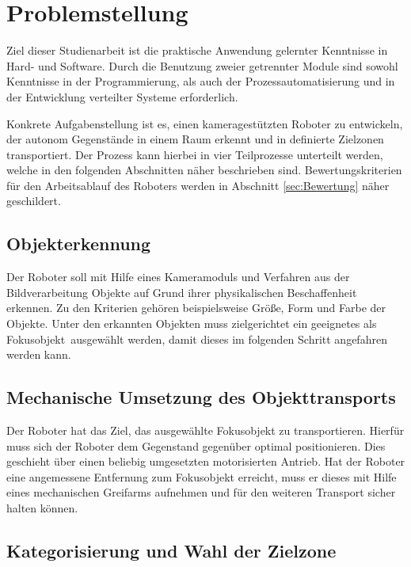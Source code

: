 \chapter{Problemstellung}
\label{cha:Problemstellung}

Ziel dieser Studienarbeit ist die praktische Anwendung gelernter Kenntnisse in Hard- und Software. Durch die Benutzung zweier getrennter Module sind sowohl Kenntnisse in der Programmierung, als auch der Prozessautomatisierung und in der Entwicklung verteilter Systeme erforderlich.

Konkrete Aufgabenstellung ist es, einen kameragestützten Roboter zu entwickeln, der autonom Gegenstände in einem Raum erkennt und in definierte Zielzonen transportiert. Der Prozess kann hierbei in vier Teilprozesse unterteilt werden, welche in den folgenden Abschnitten näher beschrieben sind. Bewertungskriterien für den Arbeitsablauf des Roboters werden in Abschnitt \ref{sec:Bewertung} näher geschildert.

\section{Objekterkennung} 
\label{sec:Erkennung}
Der Roboter soll mit Hilfe eines Kameramoduls und Verfahren aus der Bildverarbeitung Objekte auf Grund ihrer physikalischen Beschaffenheit erkennen. Zu den Kriterien gehören beispielsweise Größe, Form und Farbe der Objekte. Unter den erkannten Objekten muss zielgerichtet ein geeignetes als \glqq Fokusobjekt\grqq\ ausgewählt werden, damit dieses im folgenden Schritt angefahren werden kann.

\section{Mechanische Umsetzung des Objekttransports}
\label{sec:Transport}

Der Roboter hat das Ziel, das ausgewählte Fokusobjekt zu transportieren. Hierfür muss sich der Roboter dem Gegenstand gegenüber optimal positionieren. Dies geschieht über einen beliebig umgesetzten motorisierten Antrieb. Hat der Roboter eine angemessene Entfernung zum Fokusobjekt erreicht, muss er  dieses mit Hilfe eines mechanischen Greifarms aufnehmen und für den weiteren Transport sicher halten können.

\section{Kategorisierung und Wahl der Zielzone}

